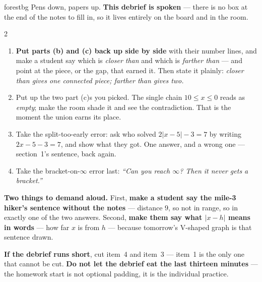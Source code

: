 \documentclass[10pt]{article}
\begin{document}
\boxguard
\begin{skillbox}{forestbg}
Pens down, papers up. \textbf{This debrief is spoken} --- there is no box at the end of the
notes to fill in, so it lives entirely on the board and in the room.
\begin{multicols}{2}
\begin{enumerate}[leftmargin=1.3em, nosep, itemsep=3pt]
  \item \textbf{Put parts (b) and (c) back up side by side} with their number lines, and make a
        student say which is \emph{closer than} and which is \emph{farther than} --- and point at
        the piece, or the gap, that earned it. Then state it plainly: \emph{closer than gives one
        connected piece; farther than gives two.}
  \item Put up the two part (c)s you picked. The single chain $10\le x\le0$ reads as
        \emph{empty}; make the room shade it and see the contradiction. That is the moment the
        union earns its place.
  \item Take the split-too-early error: ask who solved $2|x-5|-3=7$ by writing $2x-5-3=7$, and
        show what they got. One answer, and a wrong one --- section~1's sentence, back again.
  \item Take the bracket-on-$\infty$ error last: \emph{``Can you reach $\infty$? Then it never
        gets a bracket.''}
\end{enumerate}
\columnbreak
\textbf{Two things to demand aloud.} First, \textbf{make a student say the mile-3 hiker's
sentence without the notes} --- distance $9$, so not in range, so in exactly one of the two
answers. Second, \textbf{make them say what $|x-h|$ means in words} --- how far $x$ is from $h$
--- because tomorrow's V-shaped graph is that sentence drawn.

\textbf{If the debrief runs short}, cut item~4 and item~3 --- item~1 is the only one that cannot
be cut. \textbf{Do not let the debrief eat the last thirteen minutes} --- the homework start is
not optional padding, it is the individual practice.
\end{multicols}
\end{skillbox}
\end{document}
